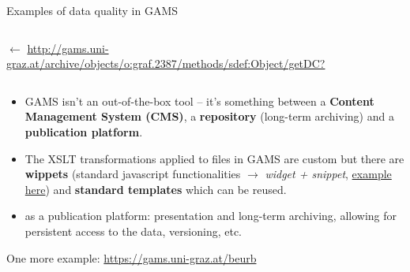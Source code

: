 \begin{frame}[allowframebreaks]{Examples of data quality in GAMS}
\begin{columns}
    $\leftarrow$ {\scriptsize \protect\url{http://gams.uni-graz.at/archive/objects/o:graf.2387/methods/sdef:Object/getDC?}}
    \end{columns}
    
    \begin{itemize}
        \item GAMS isn't an out-of-the-box tool -- it's something between a \textbf{Content Management System (CMS)}, a \textbf{repository} (long-term archiving) and a \textbf{publication platform}. 
        \item The XSLT transformations applied to files in GAMS are custom but there are \textbf{wippets} (standard javascript functionalities $\to$ \emph{widget + snippet}, \href{https://github.com/KONDE-AT/gams-wippets}{example here}) and \textbf{standard templates} which can be reused. 
        \item as a publication platform: presentation and long-term archiving, allowing for persistent access to the data, versioning, etc.
    \end{itemize}
    
    One more example: \protect\url{https://gams.uni-graz.at/beurb}
    \bigskip
    
    \begin{columns}
    

\end{columns}
\end{frame}
